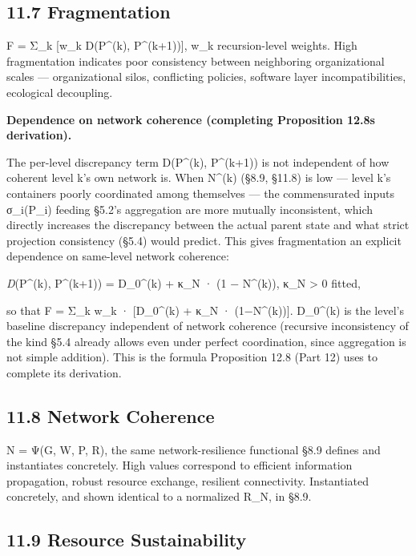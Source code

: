 \documentclass[
]{article}
\begin{document}
\hypertarget{fragmentation}{%
\subsection{11.7 Fragmentation}\label{fragmentation}}

F = Σ\_k {[}w\_k D(P\^{}(k), P\^{}(k+1)){]}, w\_k recursion-level
weights. High fragmentation indicates poor consistency between
neighboring organizational scales --- organizational silos, conflicting
policies, software layer incompatibilities, ecological decoupling.

\textbf{Dependence on network coherence (completing Proposition 12.8s
derivation).}

The per-level discrepancy term D(P\^{}(k), P\^{}(k+1)) is not
independent of how coherent level k's own network is. When N\^{}(k)
(§8.9, §11.8) is low --- level k's containers poorly coordinated among
themselves --- the commensurated inputs σ\_i(P\_i) feeding §5.2's
aggregation are more mutually inconsistent, which directly increases the
discrepancy between the actual parent state and what strict projection
consistency (§5.4) would predict. This gives fragmentation an explicit
dependence on same-level network coherence:

\emph{D}(P\^{}(k), P\^{}(k+1)) = D\_0\^{}(k) + κ\_N · (1 − N\^{}(k)),
κ\_N \textgreater{} 0 fitted,

so that F = Σ\_k w\_k · {[}D\_0\^{}(k) + κ\_N · (1−N\^{}(k)){]}.
D\_0\^{}(k) is the level's baseline discrepancy independent of network
coherence (recursive inconsistency of the kind §5.4 already allows even
under perfect coordination, since aggregation is not simple addition).
This is the formula Proposition 12.8 (Part 12) uses to complete its
derivation.

\hypertarget{network-coherence}{%
\subsection{11.8 Network Coherence}\label{network-coherence}}

N = Ψ(G, W, P, R), the same network-resilience functional §8.9 defines
and instantiates concretely. High values correspond to efficient
information propagation, robust resource exchange, resilient
connectivity. Instantiated concretely, and shown identical to a
normalized R\_N, in §8.9.

\hypertarget{resource-sustainability}{%
\subsection{11.9 Resource
Sustainability}\label{resource-sustainability}}
\end{document}
